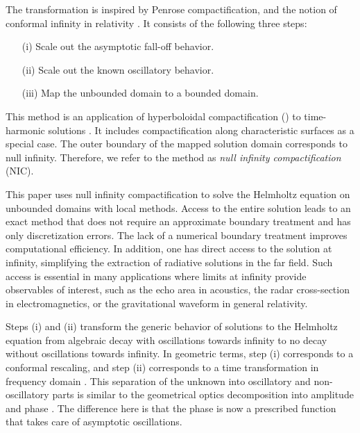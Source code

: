 \documentclass[final,onefignum,onetabnum]{siamart190516}
\begin{document}
The transformation is inspired by Penrose compactification, and the notion of conformal infinity in relativity \cite{Penrose, Penrose65, Frauendiener2004, Winicour2012}. It consists of the following three steps:
\begin{itemize}
	\item[(i)] Scale out the asymptotic fall-off behavior.
	\item[(ii)] Scale out the known oscillatory behavior.
	\item[(iii)] Map the unbounded domain to a bounded domain.
\end{itemize}
This method is an application of hyperboloidal compactification (\cite{Zenginoglu08, ZENGINOGLU20112286, Macedo_2020}) to time-harmonic solutions \cite{ZengFramework, ansorg2016spectral, macedo2018hyperboloidal, bizon2020toy, jaramillo2021pseudospectrum, jaramillo2021gravitational, destounis2021pseudospectrum, gasperin2021physical}. It includes compactification along characteristic surfaces as a special case. The outer boundary of the mapped solution domain corresponds to null infinity. Therefore, we refer to the method as \emph{null infinity compactification} (NIC).

This paper uses null infinity compactification to solve the Helmholtz equation on unbounded domains with local methods. Access to the entire solution leads to an exact method that does not require an approximate boundary treatment and has only discretization errors. The lack of a numerical boundary treatment improves computational efficiency. In addition, one has direct access to the solution at infinity, simplifying the extraction of radiative solutions in the far field. Such access is essential in many applications where limits at infinity provide observables of interest, such as the echo area in acoustics, the radar cross-section in electromagnetics, or the gravitational waveform in general relativity.

Steps (i) and (ii) transform the generic behavior of solutions to the Helmholtz equation from algebraic decay with oscillations towards infinity to no decay without oscillations towards infinity. In geometric terms, step (i) corresponds to a conformal rescaling, and step (ii) corresponds to a time transformation in frequency domain \cite{ZengFramework}. This separation of the unknown into oscillatory and non-oscillatory parts is similar to the geometrical optics decomposition into amplitude and phase \cite{engquist2003computational}. The difference here is that the phase is now a prescribed function that takes care of asymptotic oscillations. 
\end{document}
